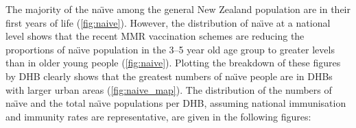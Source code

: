 \documentclass{article}
\begin{document}
The majority of the na\"{\i}ve among the general New Zealand population are in their first years of life (\autoref{fig:naive}). However, the distribution of na\"{\i}ve at a national level shows that the recent MMR vaccination schemes are reducing the proportions of na\"{\i}ve population in the 3--5 year old age group to greater levels than in older young people  (\autoref{fig:naive}). Plotting the breakdown of these figures by DHB clearly shows that the greatest numbers of na\"{\i}ve people are in DHBs with larger urban areas (\autoref{fig:naive_map}). The distribution of the numbers of na\"{\i}ve and the total na\"{\i}ve populations per DHB, assuming national immunisation and immunity rates are representative, are given in the following figures:
\end{document}
